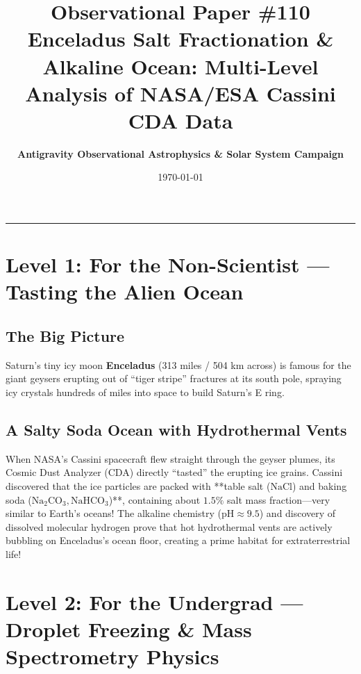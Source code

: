 \documentclass[11pt,a4paper]{article}
\title{\Huge \textbf{Observational Paper \#110}\\ \Large Enceladus Salt Fractionation \& Alkaline Ocean: Multi-Level Analysis of NASA/ESA Cassini CDA Data}
\author{\textbf{Antigravity Observational Astrophysics \& Solar System Campaign}}
\date{\today}
\begin{document}
\maketitle

\vspace{-1em}
\begin{center}
\rule{\textwidth}{1.5pt}
\end{center}

\section*{Level 1: For the Non-Scientist — Tasting the Alien Ocean}

\subsection*{The Big Picture}
Saturn's tiny icy moon \textbf{Enceladus} (313 miles / 504 km across) is famous for the giant geysers erupting out of ``tiger stripe'' fractures at its south pole, spraying icy crystals hundreds of miles into space to build Saturn's E ring.

\subsection*{A Salty Soda Ocean with Hydrothermal Vents}
When NASA's Cassini spacecraft flew straight through the geyser plumes, its Cosmic Dust Analyzer (CDA) directly ``tasted'' the erupting ice grains. Cassini discovered that the ice particles are packed with **table salt ($\mathrm{NaCl}$) and baking soda ($\mathrm{Na}_2\mathrm{CO}_3, \mathrm{NaHCO}_3$)**, containing about $1.5\%$ salt mass fraction—very similar to Earth's oceans! The alkaline chemistry ($\mathrm{pH} \approx 9.5$) and discovery of dissolved molecular hydrogen prove that hot hydrothermal vents are actively bubbling on Enceladus's ocean floor, creating a prime habitat for extraterrestrial life!

\newpage

\section*{Level 2: For the Undergrad — Droplet Freezing \& Mass Spectrometry Physics}
\end{document}
